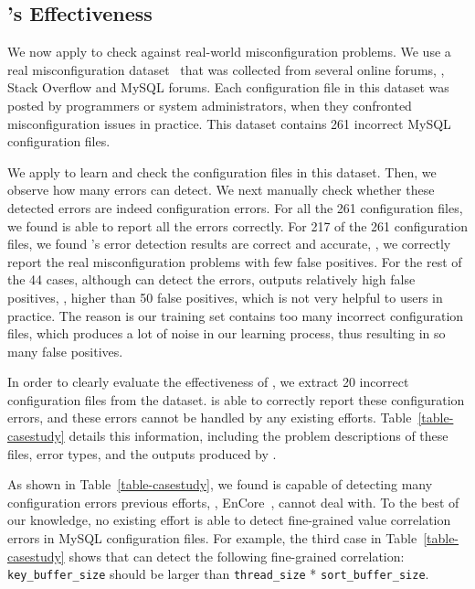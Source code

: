 \subsection{\app's Effectiveness}
\label{subsec-effectiveness}

We now apply \app to check against real-world misconfiguration problems.
We use a real misconfiguration dataset~\cite{configdataset}
that was collected from several online forums, \eg, 
Stack Overflow and MySQL forums.
Each configuration file in this dataset was posted by 
programmers or system administrators, 
when they confronted misconfiguration issues in practice.
This dataset contains 261 incorrect MySQL configuration files.

We apply \app to learn and check the configuration files in this
dataset. Then, we observe how many errors \app can detect.
We next manually check whether these detected errors are indeed
configuration errors.
For all the 261 configuration files, we found \app is
able to report all the errors correctly.
For 217 of the 261 configuration files, we found \app's 
error detection results are correct and accurate,
\ie, we correctly report the real misconfiguration problems
with few false positives.
For the rest of the 44 cases, 
although \app can detect the errors,
\app outputs relatively high false positives,
\eg, higher than 50 false positives,
which is not very helpful to users in practice.
The reason is our training set contains too many incorrect configuration
files, which produces a lot of noise in our learning process,
thus resulting in so many false positives.
  
In order to clearly evaluate the effectiveness of \app,
we extract 20 incorrect configuration files from the dataset.
\app is able to correctly report these configuration errors,
and these errors cannot be handled by any existing efforts.
Table~\ref{table-casestudy} details this information,
including the problem descriptions of these files, 
error types, and the outputs produced by \app.


As shown in Table~\ref{table-casestudy},
we found \app is capable of detecting many configuration errors previous
efforts, \eg, EnCore~\cite{zhang14encore}, cannot deal with.
To the best of our knowledge, no existing effort
is able to detect fine-grained value correlation errors in 
MySQL configuration files.
For example, the third case in Table~\ref{table-casestudy}
shows that \app can detect the following fine-grained correlation:
{\tt key\_buffer\_size} should be larger than 
{\tt thread\_size} *  {\tt sort\_buffer\_size}.



